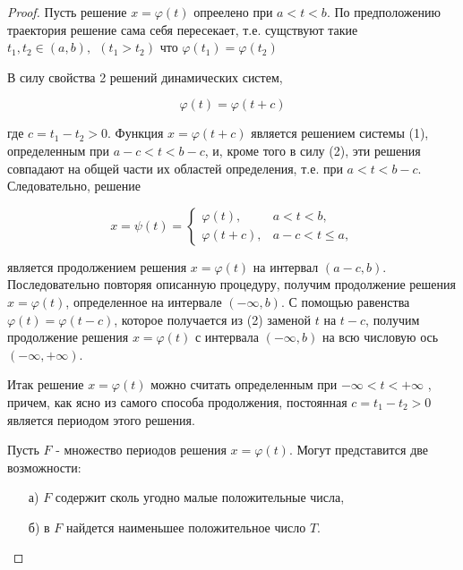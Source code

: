 \documentclass{article}
\theoremstyle{plain} \newtheorem*{theorem*}{Теорема}
\theoremstyle{plain} \newtheorem{theorem}{Теорема}[section]
\theoremstyle{definition} \newtheorem*{corollary*}{Следствие}
\theoremstyle{definition} \newtheorem{corollary}{Следствие}[section]
\begin{document}
\begin{proof}

    Пусть решение $x = \varphi(t)$ опреелено при $a < t < b$.
    По предположению траектория решение сама себя пересекает,
    т.е. сущствуют такие
    $t_1,t_2 \in (a,b) ,\ \ (t_1 > t_2)$ что
    $\varphi(t_1) = \varphi(t_2)$

    В силу свойства 2 решений динамических систем,

    \begin{equation}
        \varphi(t) = \varphi(t + c)
    \end{equation}

    где $c = t_1 - t_2 > 0$.
    Функция $x = \varphi(t+c)$ является решением системы (1),
    определенным при $a-c < t < b-c$, и, кроме того в силу (2),
    эти решения совпадают на общей части их областей определения,
    т.е. при $a < t < b-c$. Следовательно, решение

    \begin{equation}
        x = \psi(t) =
        \begin{cases}
            \varphi(t), &a < t < b,\\
            \varphi(t + c), & a-c < t \le a,
        \end{cases}
    \end{equation}

    является продолжением решения $x = \varphi(t)$
    на интервал $(a-c, b)$.
    Последовательно повторяя описанную процедуру,
    получим продолжение
    решения $x = \varphi(t)$, определенное на интервале
    $(- \infty, b)$.
\newline
    С помощью равенства $\varphi(t) = \varphi(t - c)$, которое
    получается из (2) заменой $t$ на $t - c$, получим продолжение
    решения $x = \varphi(t)$ с интервала $(- \infty, b)$ на всю
    числовую ось $(-\infty, +\infty)$.

    Итак решение $x = \varphi(t)$  можно считать
    определенным при $- \infty < t < + \infty$ , причем,
    как ясно из самого способа продолжения, постоянная
    $c = t_1 - t_2 > 0$ является периодом этого решения.

    Пусть $F$ - множество периодов решения $x = \varphi(t)$.
    Могут представится две возможности:

    \begin{itemize}
        \item[а)] $F$ содержит сколь угодно малые положительные числа,
        \item[б)] в $F$ найдется наименьшее положительное число $T$.
    \end{itemize}


\end{proof}
\end{document}
